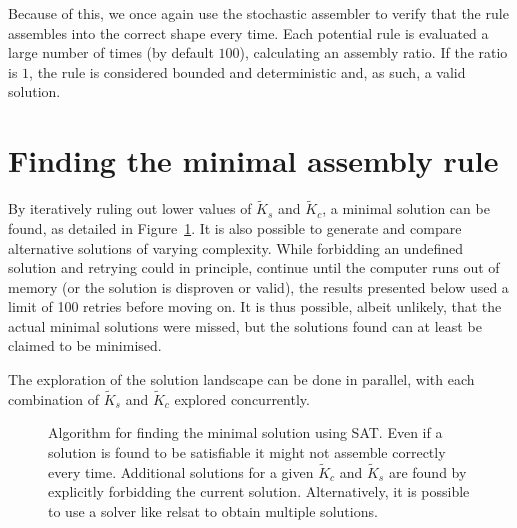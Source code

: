Because of this, we once again use the stochastic assembler to verify that the rule assembles into the correct shape every time. Each potential rule is evaluated a large number of times (by default \(100\)), calculating an assembly ratio. If the ratio is \(1\), the rule is considered bounded and deterministic and, as such, a valid solution.


\section{Finding the minimal assembly rule}

By iteratively ruling out lower values of \(\widetilde{K}_s\) and \(\widetilde{K}_c\), a minimal solution can be found, as detailed in Figure~\ref{fig:sat_alg}. It is also possible to generate and compare alternative solutions of varying complexity. While forbidding an undefined solution and retrying could in principle, continue until the computer runs out of memory (or the solution is disproven or valid), the results presented below used a limit of 100 retries before moving on. It is thus possible, albeit unlikely, that the actual minimal solutions were missed, but the solutions found can at least be claimed to be minimised. 

The exploration of the solution landscape can be done in parallel, with each combination of \(\widetilde{K}_s\) and \(\widetilde{K}_c\) explored concurrently.

\begin{figure}
    \centering
    \resizebox{\textwidth}{!}{}
    \caption{Algorithm for finding the minimal solution using SAT. Even if a solution is found to be satisfiable it might not assemble correctly every time. Additional solutions for a given \(\widetilde{K}_c\) and \(\widetilde{K}_s\) are found by explicitly forbidding the current solution. Alternatively, it is possible to use a solver like relsat to obtain multiple solutions. }
    \label{fig:sat_alg}
\end{figure}


